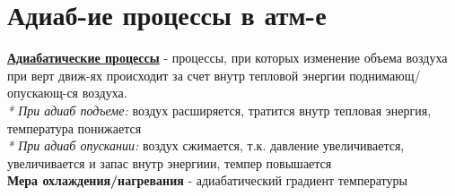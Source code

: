 
\section{Адиаб-ие процессы в атм-е}
\par \underline{\textbf{Адиабатические процессы}} - процессы, при которых изменение объема воздуха при верт движ-ях происходит за счет внутр тепловой энергии поднимающ/опускающ-ся воздуха.\\
\textit{* При адиаб подъеме:} воздух расширяется, тратится внутр тепловая энергия, температура понижается\\
\textit{* При адиаб опускании:} воздух сжимается, т.к. давление увеличивается, увеличивается и запас внутр энергиии, темпер повышается\\
\textbf{Мера охлаждения/нагревания} - адиабатический градиент температуры
